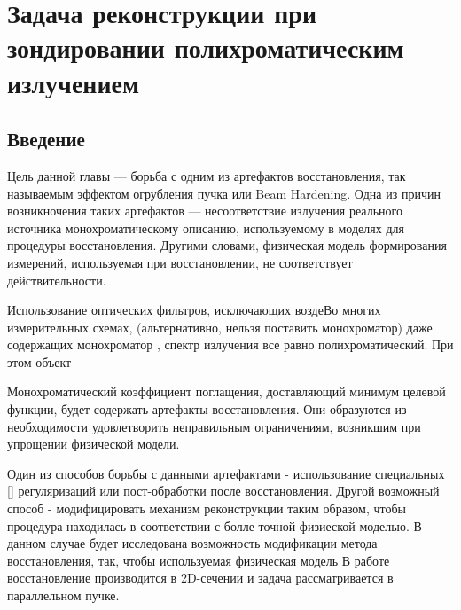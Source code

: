 \chapter{Задача реконструкции при зондировании полихроматическим излучением} \label{chapt3}
\section{Введение}

Цель данной главы --- борьба с одним из артефактов восстановления, так называемым эффектом огрубления пучка или Beam Hardening. 
Одна из причин возникночения таких артефактов --- несоответствие излучения реального источника монохроматическому описанию, используемому в моделях для процедуры восстановления.
Другими словами, физическая модель формирования измерений, используемая при восстановлении, не соответствует действительности.

Использование оптических фильтров, исключающих воздеВо многих измерительных схемах, (альтернативно, нельзя поставить монохроматор) даже содержащих монохроматор \cite{chukalina2014xray}, спектр излучения все равно полихроматический. 
При этом объект

Монохроматический коэффициент поглащения, доставляющий минимум целевой функции, будет содержать артефакты восстановления.
Они образуются из необходимости удовлетворить неправильным ограничениям, возникшим при упрощении физической модели.

Один из способов борьбы с данными артефактами - использование специальных [] регуляризаций или пост-обработки после восстановления.
Другой возможный способ - модифицировать механизм реконструкции таким образом, чтобы процедура находилась в соответствии с болле точной физиеской моделью.
В данном случае будет исследована возможность модификации метода восстановления, так, чтобы используемая физическая модель 
В работе восстановление производится в 2D-сечении и задача рассматривается в параллельном пучке.


